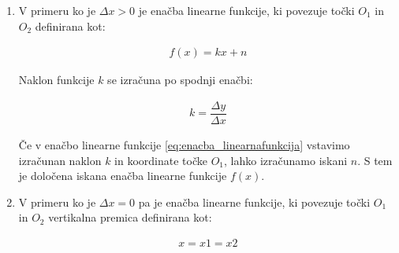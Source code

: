 \begin{enumerate}
	\item V primeru ko je $\Delta{x} > 0$ je enačba linearne funkcije, ki povezuje točki $O_1$ in $O_2$ definirana kot:
		
	\begin{ceqn}
		\begin{align}
		f(x) = kx + n \label{eq:enacba_linearnafunkcija}
		\end{align}
	\end{ceqn}

	Naklon funkcije $k$ se izračuna po spodnji enačbi:
	
	\begin{ceqn}
		\begin{align}
		k = \dfrac{\Delta{y}}{\Delta{x}}
		\end{align}
	\end{ceqn}

Če v enačbo linearne funkcije \ref{eq:enacba_linearnafunkcija} vstavimo izračunan naklon $k$ in koordinate točke $O_1$, lahko izračunamo iskani $n$. S tem je določena iskana enačba linearne funkcije $f(x)$.



	\item V primeru ko je $\Delta{x} = 0$ pa je enačba linearne funkcije, ki povezuje točki $O_1$ in $O_2$ vertikalna premica definirana kot:
	
	\begin{ceqn}
	\begin{align}
	x = x1 = x2
	\end{align}
\end{ceqn}

\end{enumerate}






